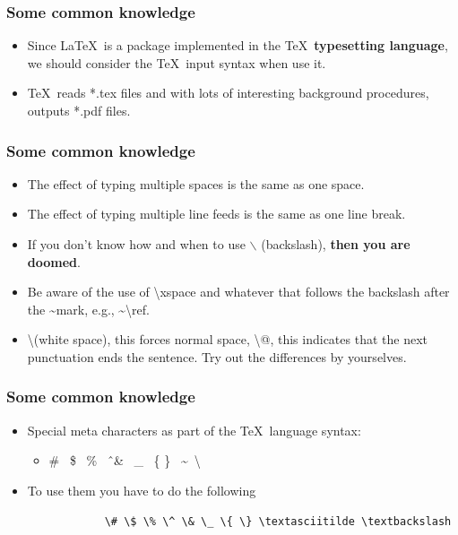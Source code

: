 \documentclass[11pt]{beamer}
\begin{document}
\begin{frame}
	\frametitle{Some common knowledge}

	\begin{itemize}
		\item Since \LaTeX \ is a package implemented in the \TeX \ \textbf{typesetting language}, we should consider the \TeX \ input syntax when use it.
		\item \TeX \ reads *.tex files and with lots of interesting background procedures, outputs *.pdf files. 
	\end{itemize}
	
\end{frame}

\begin{frame}
	\frametitle{Some common knowledge}
	
	\begin{itemize}
		\item The effect of typing multiple spaces is the same as one space.
		\item The effect of typing multiple line feeds is the same as one line break.
		\item If you don't know how and when to use $\backslash$ (backslash), \textbf{then you are doomed}.
		\item Be aware of the use of \textbackslash xspace and whatever that follows the backslash after the \textasciitilde mark, e.g., \textasciitilde \textbackslash ref.
		\item \textbackslash(white space), this forces normal space, \textbackslash @, this indicates that the next punctuation ends the sentence. Try out the differences by yourselves.
	\end{itemize}
	
\end{frame}

\begin{frame}[containsverbatim]
	\frametitle{Some common knowledge}

	\begin{itemize}
		\item Special meta characters as part of the \TeX \  language syntax:
		\begin{itemize}
			\item \# \ \$ \ \% \ \^ \ \& \ \_ \ \{ \} \ \textasciitilde \  \textbackslash
		\end{itemize}
		\item To use them you have to do the following
			\begin{verbatim}
			\# \$ \% \^ \& \_ \{ \} \textasciitilde \textbackslash
			\end{verbatim}
	\end{itemize}

\end{frame}
\end{document}

